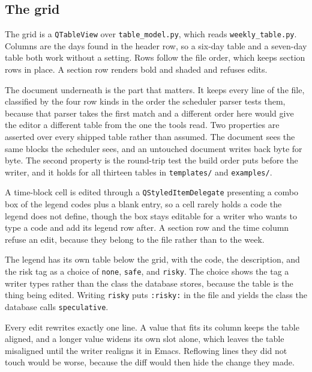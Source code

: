 \documentclass[11pt]{article}
\begin{document}
\subsection{The grid}
\label{sec:org3840fd8}

The grid is a \texttt{QTableView} over \texttt{table\_model.py}, which reads
\texttt{weekly\_table.py}. Columns are the days found in the header row, so a six-day
table and a seven-day table both work without a setting. Rows follow the file
order, which keeps section rows in place. A section row renders bold and shaded
and refuses edits.

The document underneath is the part that matters. It keeps every line of the
file, classified by the four row kinds in the order the scheduler parser tests
them, because that parser takes the first match and a different order here would
give the editor a different table from the one the tools read. Two properties
are asserted over every shipped table rather than assumed. The document sees the
same blocks the scheduler sees, and an untouched document writes back byte for
byte. The second property is the round-trip test the build order puts before the
writer, and it holds for all thirteen tables in \texttt{templates/} and \texttt{examples/}.

A time-block cell is edited through a \texttt{QStyledItemDelegate} presenting a combo
box of the legend codes plus a blank entry, so a cell rarely holds a code the
legend does not define, though the box stays editable for a writer who wants to
type a code and add its legend row after. A section row and the time column
refuse an edit, because they belong to the file rather than to the week.

The legend has its own table below the grid, with the code, the description, and
the risk tag as a choice of \texttt{none}, \texttt{safe}, and \texttt{risky}. The choice shows the
tag a writer types rather than the class the database stores, because the table
is the thing being edited. Writing \texttt{risky} puts \texttt{:risky:} in the file and yields
the class the database calls \texttt{speculative}.

Every edit rewrites exactly one line. A value that fits its column keeps the
table aligned, and a longer value widens its own slot alone, which leaves the
table misaligned until the writer realigns it in Emacs. Reflowing lines they did
not touch would be worse, because the diff would then hide the change they made.
\end{document}
